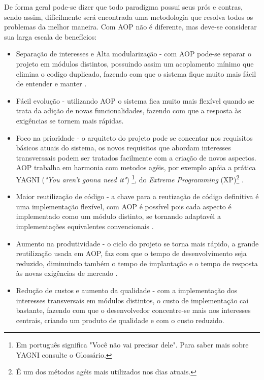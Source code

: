 \documentclass[tc,openright]{iiufrgs}
\begin{document}
De forma geral pode-se dizer que todo paradigma possui seus prós e contras, sendo assim, difícilmente será encontrada uma metodologia que resolva todos os problemas da melhor maneira. Com AOP não é diferente, mas deve-se considerar sua larga escala de benefícios:

\begin{itemize}
\item Separação de interesses e Alta modularização - com AOP pode-se separar o projeto em módulos distintos, possuindo assim um acoplamento mínimo que elimina o codigo duplicado, fazendo com que o sistema fique muito mais fácil de entender e manter \cite{laddad2003aspectj}.
\item Fácil evolução - utilizando AOP o sistema fica muito mais flexível quando se trata da adição de novas funcionalidades, fazendo com que a resposta às exigências se tornem mais rápidas.
\item Foco na prioridade - o arquiteto do projeto pode se concentar nos requisitos básicos atuais do sistema, os novos requisitos que abordam interesses transverssais podem ser tratados facilmente com a criação de novos aspectos. AOP trabalha em harmonia com metodos agéis, por exemplo apóia a prática YAGNI (\textit{"You aren’t gonna need it"}) \footnote{Em português significa "Você não vai precisar dele". Para saber mais sobre YAGNI consulte o Glossário.}, do \textit{Extreme Programming} (XP)\footnote{É um dos métodos agéis mais utilizados nos dias atuais.} \cite{laddad2003aspectj}.
\item Maior reutilização de código - a chave para a reutização de código definitiva é uma implementação flexível, com AOP é possível pois cada aspecto é implementado como um módulo distinto, se tornando adaptavél a implementações equivalentes convencionais \cite{laddad2003aspectj}. 
\item Aumento na produtividade - o ciclo do projeto se torna mais rápido, a grande reutilização usada em AOP, faz com que o tempo de desenvolvimento seja reduzido, diminuindo também o tempo de implantação e o tempo de resposta às novas exigências de mercado \cite{laddad2003aspectj}. 
\item Redução de custos e aumento da qualidade - com a implementação dos interesses transversais em módulos distintos, o custo de implementação cai bastante, fazendo com que o desenvolvedor concentre-se mais nos interesses centrais, criando um produto de qualidade e com o custo reduzido.
\end{itemize}
\end{document}
